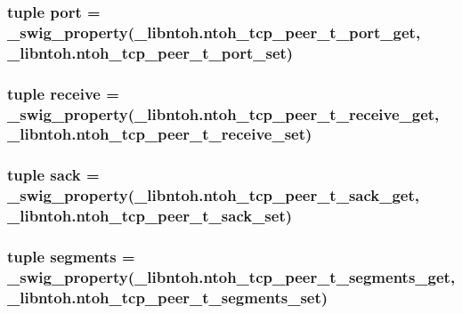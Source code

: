 \hypertarget{classlibntoh_1_1ntoh__tcp__peer__t_a1aadf525515ecfcf662c2aa51a503763}{
\subsubsection[{port}]{\setlength{\rightskip}{0pt plus 5cm}tuple port = {\bf \-\_\-swig\-\_\-property}(\-\_\-libntoh.\-ntoh\-\_\-tcp\-\_\-peer\-\_\-t\-\_\-port\-\_\-get, \-\_\-libntoh.\-ntoh\-\_\-tcp\-\_\-peer\-\_\-t\-\_\-port\-\_\-set)\hspace{0.3cm}{\ttfamily [static]}}}\label{classlibntoh_1_1ntoh__tcp__peer__t_a1aadf525515ecfcf662c2aa51a503763}
\hypertarget{classlibntoh_1_1ntoh__tcp__peer__t_abe7dc0678d2658dea89330f2a7d15b7c}{
\subsubsection[{receive}]{\setlength{\rightskip}{0pt plus 5cm}tuple receive = {\bf \-\_\-swig\-\_\-property}(\-\_\-libntoh.\-ntoh\-\_\-tcp\-\_\-peer\-\_\-t\-\_\-receive\-\_\-get, \-\_\-libntoh.\-ntoh\-\_\-tcp\-\_\-peer\-\_\-t\-\_\-receive\-\_\-set)\hspace{0.3cm}{\ttfamily [static]}}}\label{classlibntoh_1_1ntoh__tcp__peer__t_abe7dc0678d2658dea89330f2a7d15b7c}
\hypertarget{classlibntoh_1_1ntoh__tcp__peer__t_ae1f4a14905497ecba8d6687be3b9bcdd}{
\subsubsection[{sack}]{\setlength{\rightskip}{0pt plus 5cm}tuple sack = {\bf \-\_\-swig\-\_\-property}(\-\_\-libntoh.\-ntoh\-\_\-tcp\-\_\-peer\-\_\-t\-\_\-sack\-\_\-get, \-\_\-libntoh.\-ntoh\-\_\-tcp\-\_\-peer\-\_\-t\-\_\-sack\-\_\-set)\hspace{0.3cm}{\ttfamily [static]}}}\label{classlibntoh_1_1ntoh__tcp__peer__t_ae1f4a14905497ecba8d6687be3b9bcdd}
\hypertarget{classlibntoh_1_1ntoh__tcp__peer__t_a54b6380f989a7f1215352bd7588e082d}{
\subsubsection[{segments}]{\setlength{\rightskip}{0pt plus 5cm}tuple segments = {\bf \-\_\-swig\-\_\-property}(\-\_\-libntoh.\-ntoh\-\_\-tcp\-\_\-peer\-\_\-t\-\_\-segments\-\_\-get, \-\_\-libntoh.\-ntoh\-\_\-tcp\-\_\-peer\-\_\-t\-\_\-segments\-\_\-set)\hspace{0.3cm}{\ttfamily [static]}}}\label{classlibntoh_1_1ntoh__tcp__peer__t_a54b6380f989a7f1215352bd7588e082d}
